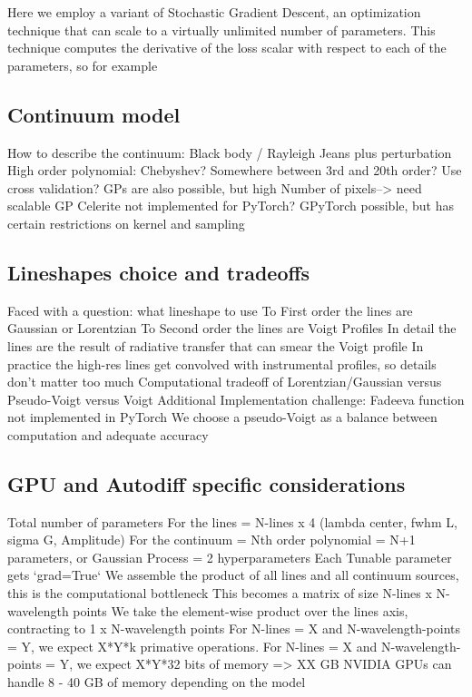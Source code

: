 \documentclass[modern]{aastex631}
\begin{document}
Here we employ a variant of Stochastic Gradient Descent, an optimization technique that can scale to a virtually unlimited number of parameters.  This technique computes the derivative of the loss scalar with respect to each of the parameters, so for example %




\subsection{Continuum model}
\begin{outline}
  \1 How to describe the continuum:
  \2 Black body / Rayleigh Jeans plus perturbation
  \2 High order polynomial: Chebyshev? Somewhere between 3rd and 20th order?
  \2 Use cross validation?
  \1 GPs are also possible, but high Number of pixels--> need scalable GP
  \2 Celerite not implemented for PyTorch?
  \2 GPyTorch possible, but has certain restrictions on kernel and sampling
\end{outline}

\subsection{Lineshapes choice and tradeoffs}
\begin{outline}
  \1 Faced with a question: what lineshape to use
  \2 To First order the lines are Gaussian or Lorentzian
  \2 To Second order the lines are Voigt Profiles
  \2 In detail the lines are the result of radiative transfer that can smear the Voigt profile
  \2 In practice the high-res lines get convolved with instrumental profiles, so details don't matter too much
  \1 Computational tradeoff of Lorentzian/Gaussian versus Pseudo-Voigt versus Voigt
  \2 Additional Implementation challenge: Fadeeva function not implemented in PyTorch
  \1 We choose a pseudo-Voigt as a balance between computation and adequate accuracy
\end{outline}

\subsection{GPU and Autodiff specific considerations}
\begin{outline}
  \1 Total number of parameters
  \2 For the lines =  N-lines x 4 (lambda center, fwhm L, sigma G, Amplitude)
  \2 For the continuum = Nth order polynomial = N+1 parameters, or Gaussian Process = 2 hyperparameters
  \1 Each Tunable parameter gets `grad=True`
  \1 We assemble the product of all lines and all continuum sources, this is the computational bottleneck
  \1 This becomes a matrix of size N-lines x N-wavelength points
  \1 We take the element-wise product over the lines axis, contracting to 1 x N-wavelength points
  \1 For N-lines = X and N-wavelength-points = Y, we expect X*Y*k primative operations.
  \1 For N-lines = X and N-wavelength-points = Y, we expect X*Y*32 bits of memory => XX GB
  \1 NVIDIA GPUs can handle 8 - 40 GB of memory depending on the model
\end{outline}
\end{document}
